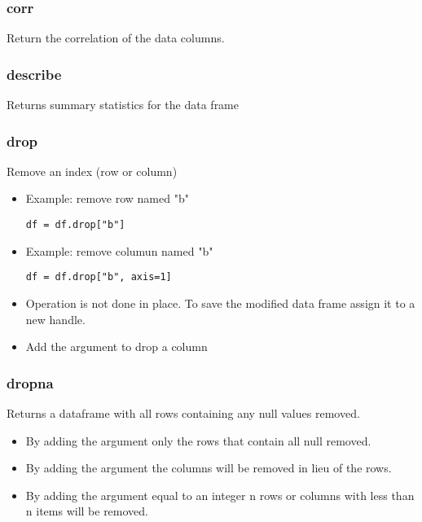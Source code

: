 %
\subsubsection{corr}
Return the correlation of the data columns.

%
\subsubsection{describe}
Returns summary statistics for the data frame

%
\subsubsection{drop}
Remove an index (row or column)
  \begin{itemize}

    \item Example: remove row named "b"
\begin{lstlisting}
df = df.drop["b"]
\end{lstlisting}

    \item Example: remove columun named "b"
\begin{lstlisting}
df = df.drop["b", axis=1]
\end{lstlisting}

    \item Operation is not done in place.  To save the modified data frame
      assign it to a new handle.

    \item Add the argument \color{red}{axis=1} to drop a column
  \end{itemize}

%
\subsubsection{dropna}
Returns a dataframe with all rows containing any null values removed.
  \begin{itemize}

    \item By adding the argument {\color{red}{how='all'}} only the rows that
      contain all null removed.

    \item By adding the argument {\color{red}{axis=1}} the columns will be
      removed in lieu of the rows.

    \item By adding the argument {\color{red}{thresh}} equal to an integer n
      rows or columns with less than n items will be removed.
  \end{itemize}

